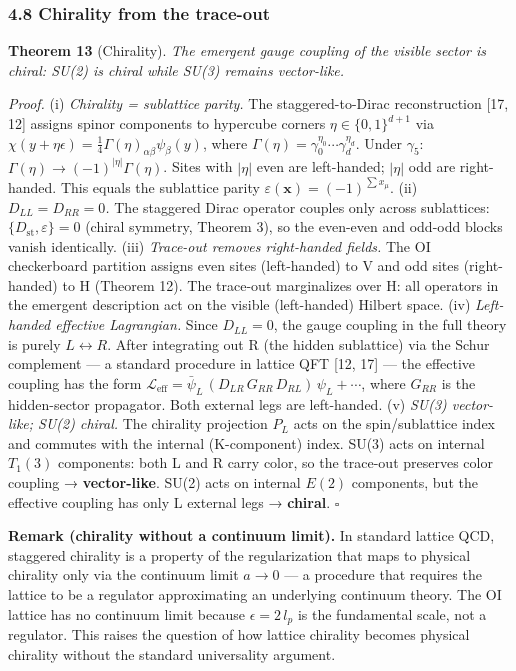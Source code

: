 \documentclass[
]{article}
\begin{document}
\hypertarget{chirality-from-the-trace-out}{%
\subsubsection{4.8 Chirality from the
trace-out}\label{chirality-from-the-trace-out}}

\textbf{Theorem 13} (Chirality). \emph{The emergent gauge coupling of
the visible sector is chiral: SU(2) is chiral while SU(3) remains
vector-like.}

\emph{Proof.} (i) \emph{Chirality = sublattice parity.} The
staggered-to-Dirac reconstruction {[}17, 12{]} assigns spinor components
to hypercube corners \(\eta \in \{0,1\}^{d+1}\) via
\(\chi(y + \eta\epsilon) = \frac{1}{4}\Gamma(\eta)_{\alpha\beta}\psi_\beta(y)\),
where \(\Gamma(\eta) = \gamma_0^{\eta_0}\cdots\gamma_d^{\eta_d}\). Under
\(\gamma_5\): \(\Gamma(\eta) \to (-1)^{|\eta|}\Gamma(\eta)\). Sites with
\(|\eta|\) even are left-handed; \(|\eta|\) odd are right-handed. This
equals the sublattice parity
\(\varepsilon(\mathbf{x}) = (-1)^{\sum x_\mu}\). (ii)
\emph{\(D_{LL} = D_{RR} = 0\).} The staggered Dirac operator couples
only across sublattices: \(\{D_{\text{st}}, \varepsilon\} = 0\) (chiral
symmetry, Theorem 3), so the even-even and odd-odd blocks vanish
identically. (iii) \emph{Trace-out removes right-handed fields.} The OI
checkerboard partition assigns even sites (left-handed) to V and odd
sites (right-handed) to H (Theorem 12). The trace-out marginalizes over
H: all operators in the emergent description act on the visible
(left-handed) Hilbert space. (iv) \emph{Left-handed effective
Lagrangian.} Since \(D_{LL} = 0\), the gauge coupling in the full theory
is purely \(L \leftrightarrow R\). After integrating out R (the hidden
sublattice) via the Schur complement --- a standard procedure in lattice
QFT {[}12, 17{]} --- the effective coupling has the form
\(\mathcal{L}_{\text{eff}} = \bar{\psi}_L\,(D_{LR}\,G_{RR}\,D_{RL})\,\psi_L + \cdots\),
where \(G_{RR}\) is the hidden-sector propagator. Both external legs are
left-handed. (v) \emph{SU(3) vector-like; SU(2) chiral.} The chirality
projection \(P_L\) acts on the spin/sublattice index and commutes with
the internal (K-component) index. SU(3) acts on internal \(T_1(3)\)
components: both L and R carry color, so the trace-out preserves color
coupling → \textbf{vector-like}. SU(2) acts on internal \(E(2)\)
components, but the effective coupling has only L external legs →
\textbf{chiral}. \(\square\)

\textbf{Remark (chirality without a continuum limit).} In standard
lattice QCD, staggered chirality is a property of the regularization
that maps to physical chirality only via the continuum limit \(a \to 0\)
--- a procedure that requires the lattice to be a regulator
approximating an underlying continuum theory. The OI lattice has no
continuum limit because \(\epsilon = 2\,l_p\) is the fundamental scale,
not a regulator. This raises the question of how lattice chirality
becomes physical chirality without the standard universality argument.
\end{document}
